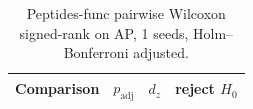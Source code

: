 \begin{table}[t]
\centering
\small
\caption{Peptides-func pairwise Wilcoxon signed-rank on AP, 1 seeds, Holm--Bonferroni adjusted.}
\label{tab:peptides_func_K8_pw}
\begin{tabular}{lrrc}
\toprule
Comparison & $p_{\mathrm{adj}}$ & $d_z$ & reject $H_0$ \\
\midrule
\bottomrule
\end{tabular}
\end{table}
